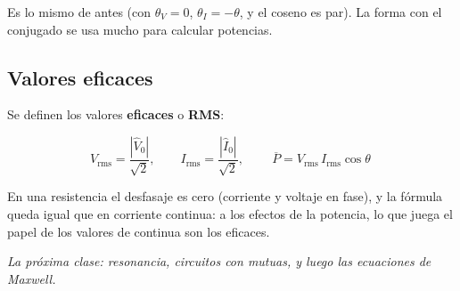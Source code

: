 \documentclass[12pt,a4paper]{article}
\begin{document}
Es lo mismo de antes (con $\theta_V = 0$, $\theta_I = -\theta$, y el coseno es
par). La forma con el conjugado se usa mucho para calcular potencias.

\subsection{Valores eficaces}

Se definen los valores \textbf{eficaces} o \textbf{RMS}:

\[
V_{\text{rms}} = \frac{|\hat V_0|}{\sqrt2},\qquad I_{\text{rms}} = \frac{|\hat I_0|}{\sqrt2},
\qquad
\boxed{\ \overline{P} = V_{\text{rms}}\,I_{\text{rms}}\cos\theta\ }
\]

En una resistencia el desfasaje es cero (corriente y voltaje en fase), y la
fórmula queda igual que en corriente continua: a los efectos de la potencia, lo
que juega el papel de los valores de continua son los eficaces.

\noindent\emph{La próxima clase: resonancia, circuitos con mutuas, y luego las ecuaciones de
Maxwell.}
\end{document}

